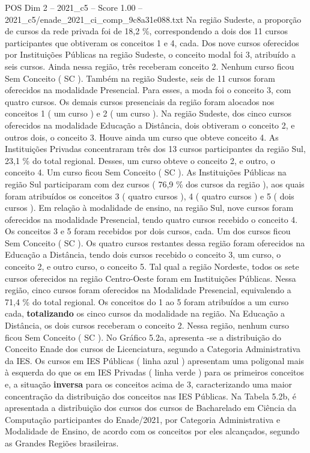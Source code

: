 \begin{textsample}{POS Dim 2 – 2021\_c5 – Score 1.00 – 2021\_c5/enade\_2021\_ci\_comp\_9c8a31e088.txt}
Na região Sudeste, a proporção de cursos da rede privada foi de 18,2 \%, correspondendo a dois dos 11 cursos participantes que obtiveram os conceitos 1 e 4, cada.
Dos nove cursos oferecidos por Instituições Públicas na região Sudeste, o conceito modal foi 3, atribuído a seis cursos.
Ainda nessa região, três receberam conceito 2.
Nenhum curso ficou Sem Conceito ( SC ).
Também na região Sudeste, seis de 11 cursos foram oferecidos na modalidade Presencial.
Para esses, a moda foi o conceito 3, com quatro cursos.
Os demais cursos presenciais da região foram alocados nos conceitos 1 ( um curso ) e 2 ( um curso ).
Na região Sudeste, dos cinco cursos oferecidos na modalidade Educação a Distância, dois obtiveram o conceito 2, e outros dois, o conceito 3.
Houve ainda um curso que obteve conceito 4.
As Instituições Privadas concentraram três dos 13 cursos participantes da região Sul, 23,1 \% do total regional.
Desses, um curso obteve o conceito 2, e outro, o conceito 4.
Um curso ficou Sem Conceito ( SC ).
As Instituições Públicas na região Sul participaram com dez cursos ( 76,9 \% dos cursos da região ), aos quais foram atribuídos os conceitos 3 ( quatro cursos ), 4 ( quatro cursos ) e 5 ( dois cursos ).
Em relação à modalidade de ensino, na região Sul, nove cursos foram oferecidos na modalidade Presencial, tendo quatro cursos recebido o conceito 4.
Os conceitos 3 e 5 foram recebidos por dois cursos, cada.
Um dos cursos ficou Sem Conceito ( SC ).
Os quatro cursos restantes dessa região foram oferecidos na Educação a Distância, tendo dois cursos recebido o conceito 3, um curso, o conceito 2, e outro curso, o conceito 5.
Tal qual a região Nordeste, todos os sete cursos oferecidos na região Centro-Oeste foram em Instituições Públicas.
Nessa região, cinco cursos foram oferecidos na Modalidade Presencial, equivalendo a 71,4 \% do total regional.
Os conceitos do 1 ao 5 foram atribuídos a um curso cada, \textbf{totalizando} os cinco cursos da modalidade na região.
Na Educação a Distância, os dois cursos receberam o conceito 2.
Nessa região, nenhum curso ficou Sem Conceito ( SC ).
No Gráfico 5.2a, apresenta -se a distribuição do Conceito Enade dos cursos de Licenciatura, segundo a Categoria Administrativa da IES.
Os cursos em IES Públicas ( linha azul ) apresentam uma poligonal mais à esquerda do que os em IES Privadas ( linha verde ) para os primeiros conceitos e, a situação \textbf{inversa} para os conceitos acima de 3, caracterizando uma maior concentração da distribuição dos conceitos nas IES Públicas.
Na Tabela 5.2b, é apresentada a distribuição dos cursos dos cursos de Bacharelado em Ciência da Computação participantes do Enade/2021, por Categoria Administrativa e Modalidade de Ensino, de acordo com os conceitos por eles alcançados, segundo as Grandes Regiões brasileiras.

\end{textsample}
